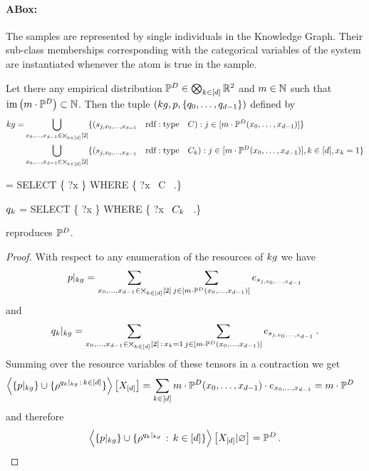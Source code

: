 \paragraph{ABox:} The samples are represented by single individuals in the Knowledge Graph.
Their sub-class memberships corresponding with the categorical variables of the system are instantiated whenever the atom is true in the sample.


\begin{theorem}
	Let there any empirical distribution $\mathbb{P}^{D}\in\bigotimes_{k\in[d]}\mathbb{R}^2$ and $m\in\mathbb{N}$ such that $\mathrm{im}\left(m\cdot\mathbb{P}^{D}\right)\subset\mathbb{N}$.
	Then the tuple $(kg,p,\{q_{0},\ldots,q_{d-1}\})$ defined by
	\begin{align}
		kg =
		& \bigcup_{{x_{0},\ldots,x_{d-1}}\in\bigtimes_{k\in[d]}[2]}  \{(
			s_{j, {x_{0},\ldots,x_{d-1}}} \quad \mathrm{rdf:type} \quad C ) : j \in [m\cdot\mathbb{P}^{D}({x_{0},\ldots,x_{d-1}})] \}  \\
		&\bigcup_{{x_{0},\ldots,x_{d-1}}\in\bigtimes_{k\in[d]}[2]}  \{(
			s_{j, {x_{0},\ldots,x_{d-1}}} \quad \mathrm{rdf:type} \quad C_k
		) :  j \in [m\cdot\mathbb{P}^{D}({x_{0},\ldots,x_{d-1}})], k\in[d] , x_{k}=1\} 
	\end{align}
	\begin{centeredcode}
		\impformula = SELECT \{ ?x \} WHERE \{ ?x \quad \rdftype \quad C \, .\}
	\end{centeredcode}
	\begin{centeredcode}
		$q_{k}$ = SELECT \{ ?x \} WHERE \{ ?x \quad \rdftype \quad $C_k$ \, .\}
	\end{centeredcode}
	reproduces $\mathbb{P}^{D}$.
\end{theorem}
\begin{proof}
	With respect to any enumeration of the resources of $kg$ we have
	\begin{align}
		{p}|_{kg} 
		= \sum_{{x_{0},\ldots,x_{d-1}}\in\bigtimes_{k\in[d]}[2]} \sum_{j \in [m\cdot\mathbb{P}^{D}({x_{0},\ldots,x_{d-1}})]} e_{s_{j, {x_{0},\ldots,x_{d-1}}} } 
	\end{align}
	and
	\begin{align}
		{q_{k}}|_{kg} 
		= \sum_{{x_{0},\ldots,x_{d-1}}\in\bigtimes_{k\in[d]}[2] \, : \, x_{k} = 1} \sum_{j \in [m\cdot\mathbb{P}^{D}({x_{0},\ldots,x_{d-1}})]} e_{s_{j, {x_{0},\ldots,x_{d-1}}} } \, . 
	\end{align}
	Summing over the resource variables of these tensors in a contraction we get
	\begin{align}
		\left\langle \{{p}|_{kg}\}\cup\{\rho^{{q_{k}}|_{kg}\, : \, k\in[d]}\}\right\rangle \left[ X_{[d]} \right]
		& = \sum_{k\in[d]}  m\cdot\mathbb{P}^{D}({x_{0},\ldots,x_{d-1}}) \cdot e_{{x_{0},\ldots,x_{d-1}}} = m \cdot \mathbb{P}^{D} 
	\end{align}
	and therefore
	\begin{align}
		\left\langle \{{p}|_{kg}\}\cup\{\rho^{{q_{k}}|_{kg}}\, : \, k\in[d]\}\right\rangle \left[ X_{[d]} | \varnothing \right] = \mathbb{P}^{D} \, . 
	\end{align}
\end{proof}

